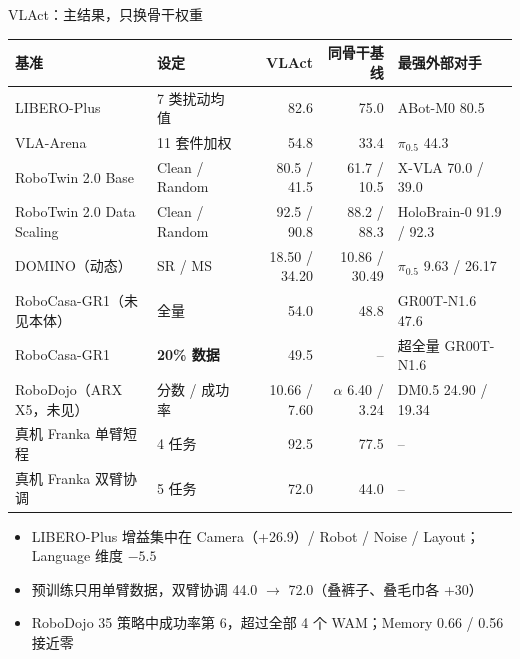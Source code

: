 \documentclass[aspectratio=169,10pt]{beamer}
\newcommand{\con}[1]{\textcolor{negative}{#1}}
\newcommand{\HL}[1]{\textcolor{emphasis}{#1}}
\begin{document}
\begin{frame}{VLAct：主结果，只换骨干权重}
  \begin{center}\footnotesize\setlength{\tabcolsep}{4pt}
  \begin{tabular}{llrrl}
    \toprule
    基准 & 设定 & VLAct & 同骨干基线 & 最强外部对手 \\
    \midrule
    LIBERO-Plus & 7 类扰动均值 & \HL{82.6} & 75.0 & ABot-M0 80.5 \\
    VLA-Arena & 11 套件加权 & \HL{54.8} & 33.4 & $\pi_{0.5}$ 44.3 \\
    RoboTwin 2.0 Base & Clean / Random & \HL{80.5 / 41.5} & 61.7 / 10.5 & X-VLA 70.0 / 39.0 \\
    RoboTwin 2.0 Data Scaling & Clean / Random & \HL{92.5} / 90.8 & 88.2 / 88.3 & HoloBrain-0 91.9 / 92.3 \\
    DOMINO（动态） & SR / MS & \HL{18.50 / 34.20} & 10.86 / 30.49 & $\pi_{0.5}$ 9.63 / 26.17 \\
    RoboCasa-GR1（未见本体） & 全量 & \HL{54.0} & 48.8 & GR00T-N1.6 47.6 \\
    RoboCasa-GR1 & \textbf{20\% 数据} & \HL{49.5} & – & 超全量 GR00T-N1.6 \\
    RoboDojo（ARX X5，未见） & 分数 / 成功率 & 10.66 / 7.60 & $\alpha$ 6.40 / 3.24 & DM0.5 24.90 / 19.34 \\
    真机 Franka 单臂短程 & 4 任务 & \HL{92.5} & 77.5 & – \\
    真机 Franka 双臂协调 & 5 任务 & \HL{72.0} & 44.0 & – \\
    \bottomrule
  \end{tabular}
  \end{center}
  \vspace{4pt}
  \begin{itemize}
    \item LIBERO-Plus 增益集中在 Camera（+26.9）/ Robot / Noise / Layout；\con{Language 维度 $-5.5$}
    \item 预训练只用单臂数据，双臂协调 44.0 $\to$ 72.0（叠裤子、叠毛巾各 +30）
    \item RoboDojo 35 策略中成功率第 6，超过全部 4 个 WAM；\con{Memory 0.66 / 0.56 接近零}
  \end{itemize}
\end{frame}
\end{document}
